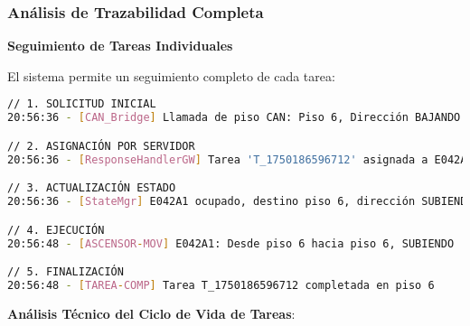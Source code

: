 \subsubsection{Análisis de Trazabilidad Completa}

\textbf{Seguimiento de Tareas Individuales}

El sistema permite un seguimiento completo de cada tarea:

\begin{lstlisting}[language=bash,caption={Ciclo de Vida Completo - Tarea T\_1750186596712},label={lst:ciclo-vida-tarea}]
// 1. SOLICITUD INICIAL
20:56:36 - [CAN_Bridge] Llamada de piso CAN: Piso 6, Dirección BAJANDO

// 2. ASIGNACIÓN POR SERVIDOR
20:56:36 - [ResponseHandlerGW] Tarea 'T_1750186596712' asignada a E042A1

// 3. ACTUALIZACIÓN ESTADO
20:56:36 - [StateMgr] E042A1 ocupado, destino piso 6, dirección SUBIENDO

// 4. EJECUCIÓN
20:56:48 - [ASCENSOR-MOV] E042A1: Desde piso 6 hacia piso 6, SUBIENDO

// 5. FINALIZACIÓN
20:56:48 - [TAREA-COMP] Tarea T_1750186596712 completada en piso 6
\end{lstlisting}

\textbf{Análisis Técnico del Ciclo de Vida de Tareas}:

